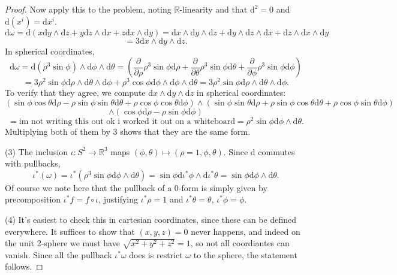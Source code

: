 \documentclass[10pt, letterpaper]{article}
\begin{document}
\begin{proof}
	Now apply this to the problem, noting $\mathbb{R} $-linearity and that $\mathrm{d} ^2=0$ and $\mathrm{d} (x^i)=\mathrm{d} x^i$.
	\[
		\mathrm{d} \omega =\mathrm{d} \left( x\mathrm{d} y\wedge \mathrm{d} z+y \mathrm{d} z\wedge \mathrm{d} x+z \mathrm{d} x\wedge \mathrm{d} y \right) =\mathrm{d} x\wedge \mathrm{d} y\wedge \mathrm{d} z+\mathrm{d} y\wedge \mathrm{d} z\wedge \mathrm{d} x+\mathrm{d} z\wedge \mathrm{d} x\wedge \mathrm{d} y
	\]
	\[
		=3\mathrm{d} x\wedge \mathrm{d} y\wedge \mathrm{d} z
	.\]
	In spherical coordinates,
	\[
		\mathrm{d} \omega =\mathrm{d} \left( \rho ^3 \sin \phi  \right) \wedge \mathrm{d} \phi \wedge \mathrm{d} \theta =\left( \frac{\partial }{\partial \rho } \rho ^3 \sin \phi  \mathrm{d} \rho + \frac{\partial }{\partial \theta } \rho ^3 \sin \phi \mathrm{d} \theta +\frac{\partial }{\partial \phi } \rho ^3 \sin \phi \mathrm{d} \phi  \right) 
	\]
	\[
		=3\rho ^2 \sin \phi \mathrm{d} \rho \wedge \mathrm{d} \theta \wedge \mathrm{d} \phi +\rho ^3 \cos \phi \mathrm{d} \phi \wedge \mathrm{d} \phi \wedge \mathrm{d} \theta =3\rho ^2 \sin \phi \mathrm{d} \rho \wedge \mathrm{d}\theta \wedge \mathrm{d} \phi
	.\]
	To verify that they agree, we compute $\mathrm{d} x\wedge \mathrm{d} y\wedge \mathrm{d} z$ in spherical coordinates:
	\[
		\left( \sin \phi \cos \theta \mathrm{d} \rho -\rho \sin \phi \sin \theta \mathrm{d} \theta +\rho \cos \phi \cos \theta \mathrm{d} \phi  \right) \wedge \left( \sin \phi \sin \theta \mathrm{d} \rho +\rho \sin \phi \cos \theta \mathrm{d} \theta +\rho \cos \phi \sin \theta \mathrm{d} \phi  \right) 
	\]
	\[
		\wedge \left( \cos \phi \mathrm{d} \rho -\rho \sin \phi \mathrm{d} \phi  \right) 
	\]
	\[
		=\text{im not writing this out ok i worked it out on a whiteboard} = \rho ^2 \sin \phi \mathrm{d} \phi \wedge \mathrm{d} \theta 
	.\]
	Multiplying both of them by 3 shows that they are the same form.

	(3) The inclusion $\iota : S^2 \to \mathbb{R} ^3$ maps $(\phi ,\theta )\mapsto (\rho =1,\phi ,\theta )$. Since $\mathrm{d} $ commutes with pullbacks,
	\[
		\iota ^*(\omega )=\iota ^*(\rho ^3 \sin \phi \mathrm{d} \phi \wedge \mathrm{d} \theta )=\sin \phi \mathrm{d} \iota ^*\phi \wedge \mathrm{d} \iota ^*\theta =\sin \phi \mathrm{d} \phi \wedge \mathrm{d} \theta 
	.\]
	Of course we note here that the pullback of a 0-form is simply given by precomposition $\iota ^*f=f\circ \iota $, justifying $\iota ^*\rho =1$ and $\iota ^*\theta =\theta $, $\iota ^*\phi =\phi $.
	
	(4) It's easiest to check this in cartesian coordinates, since these can be defined everywhere. It suffices to show that $(x,y,z)=0$ never happens, and indeed on the unit 2-sphere we must have $\sqrt{x^2+y^2+z^2} =1$, so not all coordiantes can vanish. Since all the pullback $\iota ^*\omega $ does is restrict $\omega $ to the sphere, the statement follows. 
\end{proof}
\end{document}
